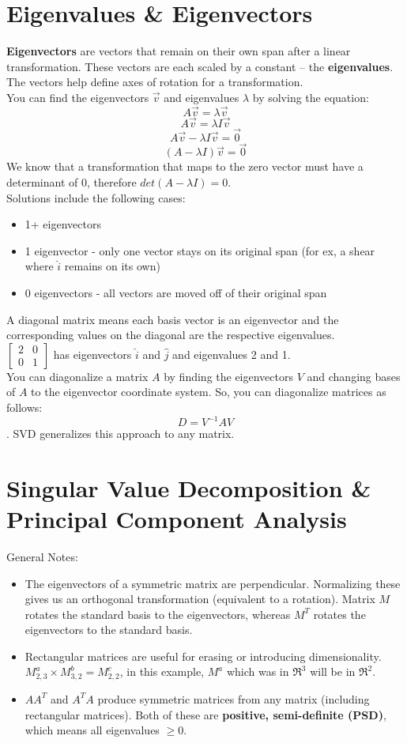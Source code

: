 \documentclass{article}
\begin{document}
\section{Eigenvalues \& Eigenvectors}
\textbf{Eigenvectors} are vectors that remain on their own span after a linear transformation. These vectors are each scaled by a constant -- the \textbf{eigenvalues}. The vectors help define axes of rotation for a transformation. \\ You can find the eigenvectors $\vec{v}$ and eigenvalues $\lambda$ by solving the equation: $$A\vec{v} = \lambda\vec{v}$$
$$A\vec{v} = \lambda I\vec{v}$$
$$A\vec{v} - \lambda I \vec{v} = \vec{0}$$
$$(A - \lambda I)\vec{v} = \vec{0}$$
We know that a transformation that maps to the zero vector must have a determinant of 0, therefore $det(A - \lambda I) = 0$. \\ Solutions include the following cases:
\begin{itemize}
    \item 1+ eigenvectors
    \item 1 eigenvector - only one vector stays on its original span (for ex, a shear where $\hat{i}$ remains on its own)
    \item 0 eigenvectors - all vectors are moved off of their original span
\end{itemize}
A diagonal matrix means each basis vector is an eigenvector and the corresponding values on the diagonal are the respective eigenvalues. \\ 
$\begin{bmatrix}
    2 & 0 \\ 0 & 1
\end{bmatrix}$ has eigenvectors $\hat{i}$ and $\hat{j}$ and eigenvalues 2 and 1. \\
You can diagonalize a matrix $A$ by finding the eigenvectors $V$ and changing bases of $A$ to the eigenvector coordinate system. So, you can diagonalize matrices as follows: $$D=V^{-1}AV$$. SVD generalizes this approach to any matrix.

\section{Singular Value Decomposition \& Principal Component Analysis}
General Notes: \begin{itemize}
    \item The eigenvectors of a symmetric matrix are perpendicular. Normalizing these gives us an orthogonal transformation (equivalent to a rotation). Matrix $M$ rotates the standard basis to the eigenvectors, whereas $M^T$ rotates the eigenvectors to the standard basis.
    \item Rectangular matrices are useful for erasing or introducing dimensionality. $M^a_{2, 3} \times M^b_{3, 2} = M^c_{2, 2}$, in this example, $M^a$ which was in $\Re^3$ will be in $\Re^2.$
    \item $AA^T$ and $A^TA$ produce symmetric matrices from any matrix (including rectangular matrices). Both of these are \textbf{positive, semi-definite (PSD)}, which means all eigenvalues $\geq 0$.
\end{itemize}
\end{document}
